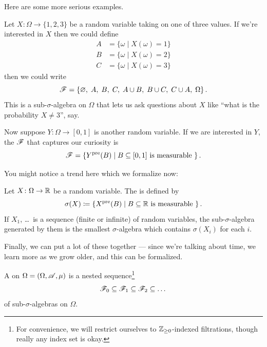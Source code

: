 Here are some more serious examples.
\begin{example}
	\listhack
	\begin{enumerate}[(a)]
		\ii Let $X \colon \Omega \to \{1,2,3\}$ be a random
		variable taking on one of three values.
		If we're interested in $X$ then we could define
		\begin{align*}
			A &= \{\omega \mid X(\omega) = 1\} \\
			B &= \{\omega \mid X(\omega) = 2\} \\
			C &= \{\omega \mid X(\omega) = 3\}
		\end{align*}
		then we could write
		\[ \mathscr F = \left\{ \varnothing, \; A, \; B, \; C, \;
				A \cup B, \; B \cup C, \; C \cup A, \; \Omega \right\}. \]
		This is a sub-$\sigma$-algebra on $\Omega$
		that lets us ask questions about $X$
		like ``what is the probability $X \neq 3$'', say.

		\ii Now suppose $Y \colon \Omega \to [0,1]$ is another random variable.
		If we are interested in $Y$,
		the $\mathscr F$ that captures our curiosity is
		\[ \mathscr F = \left\{ Y^{\text{pre}}(B) \mid B \subseteq [0,1]
			\text{ is measurable } \right\}. \]
	\end{enumerate}
\end{example}

You might notice a trend here which we formalize now:
\begin{definition}
	Let $X \colon \Omega \to \mathbb R$ be a random variable.
	The  is defined by
	\[ \sigma(X) \coloneqq \left\{ X^{\text{pre}}(B) \mid B \subseteq \mathbb R
		\text{ is measurable } \right\}. \]
	If $X_1$, \dots\ is a sequence (finite or infinite) of random variables,
	the sub-$\sigma$-algebra generated by them
	is the smallest $\sigma$-algebra which contains $\sigma(X_i)$ for each $i$.
\end{definition}

Finally, we can put a lot of these together ---
since we're talking about time, we learn more as we grow older,
and this can be formalized.
\begin{definition}
	A  on $\Omega = (\Omega, \mathscr A, \mu)$
	is a nested sequence\footnote{For convenience,
		we will restrict ourselves to $\mathbb Z_{\ge0}$-indexed
		filtrations, though really any index set is okay.}
	\[ \mathscr F_0 \subseteq \mathscr F_1 \subseteq \mathscr F_2 \subseteq \dots \]
	of sub-$\sigma$-algebras on $\Omega$.
\end{definition}

